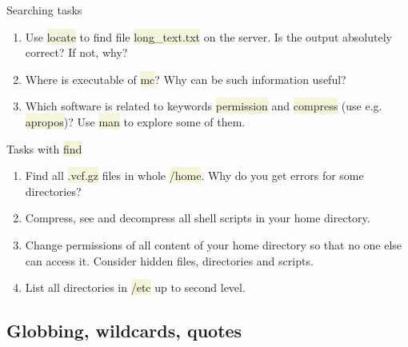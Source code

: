 \documentclass[compress, xelatex, 11pt, xcolor=svgnames, aspectratio=169,
	hyperref={
		bookmarks=true,
		unicode=true,
		colorlinks=true,
		pdftitle={Linux, command line and MetaCentrum},
		plainpages=false,
		pdfauthor={Vojtech Zeisek},
		pdfsubject={Course about use of Linux command line, writing shell scripts and using MetaCentrum of CESNET},
		pdfcreator={XeLaTeX},
		pdfkeywords={Linux, GNU, BASH, shell, command line, MetaCentrum},
		linkcolor=DarkRed, %
		anchorcolor=DarkBlue, %
		citecolor=Indigo, %
		filecolor=NavyBlue, %
		menucolor=DarkMagenta, %
		urlcolor=DarkBlue, %
		},
	url={hyphens, lowtilde} %
	]{beamer}
\renewcommand{\texttt}[1]{\colorbox{Beige}{{\ttfamily #1}}}
\begin{document}
\begin{frame}{Searching tasks}
	\begin{enumerate}
		\item Use \texttt{locate} to find file \texttt{long\_text.txt} on the server. Is the output absolutely correct? If not, why?
		\item Where is executable of \texttt{mc}? Why can be such information useful?
		\item Which software is related to keywords \texttt{permission} and \texttt{compress} (use e.g. \texttt{apropos})? Use \texttt{man} to explore some of them.
	\end{enumerate}
	\begin{block}{Tasks with \texttt{find}}
		\begin{enumerate}
			\item Find all \texttt{*.vcf.gz} files in whole \texttt{/home}. Why do you get errors for some directories?
			\item Compress, see and decompress all shell scripts in your home directory.
			\item Change permissions of all content of your home directory so that no one else can access it. Consider hidden files, directories and scripts.
			\item List all directories in \texttt{/etc} up to second level.
		\end{enumerate}
	\end{block}
\end{frame}

\subsection{Globbing, wildcards, quotes}
\end{document}
